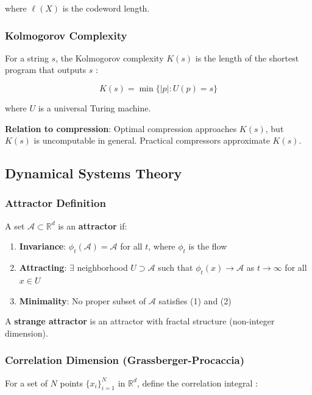 \documentclass[11pt,a4paper]{article}
\begin{document}
where $\ell(X)$ is the codeword length.

\subsubsection{Kolmogorov Complexity}

For a string $s$, the Kolmogorov complexity $K(s)$ is the length of the shortest program that outputs $s$ \cite{kolmogorov1965three}:

\begin{equation}
K(s) = \min\{|p| : U(p) = s\}
\end{equation}

where $U$ is a universal Turing machine.

\textbf{Relation to compression}: Optimal compression approaches $K(s)$, but $K(s)$ is uncomputable in general. Practical compressors approximate $K(s)$.

\subsection{Dynamical Systems Theory}

\subsubsection{Attractor Definition}

A set $\mathcal{A} \subset \mathbb{R}^d$ is an \textbf{attractor} if:

\begin{enumerate}
\item \textbf{Invariance}: $\phi_t(\mathcal{A}) = \mathcal{A}$ for all $t$, where $\phi_t$ is the flow
\item \textbf{Attracting}: $\exists$ neighborhood $U \supset \mathcal{A}$ such that $\phi_t(x) \to \mathcal{A}$ as $t \to \infty$ for all $x \in U$
\item \textbf{Minimality}: No proper subset of $\mathcal{A}$ satisfies (1) and (2)
\end{enumerate}

A \textbf{strange attractor} is an attractor with fractal structure (non-integer dimension).

\subsubsection{Correlation Dimension (Grassberger-Procaccia)}

For a set of $N$ points $\{x_i\}_{i=1}^N$ in $\mathbb{R}^d$, define the correlation integral \cite{grassberger1983measuring}:
\end{document}
